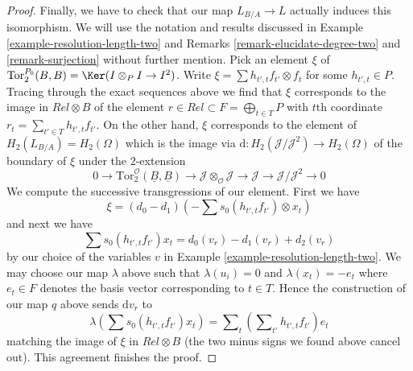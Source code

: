 \begin{proof}
\medskip\noindent
Finally, we have to check that our map $L_{B/A} \to L$ actually induces
this isomorphism. We will use the notation and results discussed in
Example \ref{example-resolution-length-two} and
Remarks \ref{remark-elucidate-degree-two} and \ref{remark-surjection}
without further mention. Pick an element $\xi$ of
$\text{Tor}_2^{P_0}(B, B) = \Ker(I \otimes_P I \to I^2)$.
Write $\xi = \sum h_{t', t}f_{t'} \otimes f_t$ for some
$h_{t', t} \in P$. Tracing through the exact sequences above we
find that $\xi$ corresponds to the image in $Rel \otimes B$
of the element $r \in Rel \subset F = \bigoplus_{t \in T} P$ with
$t$th coordinate $r_t = \sum_{t' \in T} h_{t', t}f_{t'}$.
On the other hand, $\xi$ corresponds to the element of
$H_2(L_{B/A}) = H_2(\Omega)$ which is the image
via $\text{d} : H_2(\mathcal{J}/\mathcal{J}^2) \to H_2(\Omega)$
of the boundary of $\xi$ under the $2$-extension
$$
0 \to
\text{Tor}_2^\mathcal{O}(\underline{B}, \underline{B})
\to 
\mathcal{J} \otimes_\mathcal{O} \mathcal{J} \to \mathcal{J}
\to
\mathcal{J}/\mathcal{J}^2 \to 0
$$
We compute the successive transgressions of our element. First we have
$$
\xi = (d_0 - d_1)(- \sum s_0(h_{t', t} f_{t'}) \otimes x_t)
$$
and next we have
$$
\sum s_0(h_{t', t} f_{t'}) x_t = d_0(v_r) - d_1(v_r) + d_2(v_r)
$$
by our choice of the variables $v$ in
Example \ref{example-resolution-length-two}.
We may choose our map $\lambda$ above such that
$\lambda(u_i) = 0$ and $\lambda(x_t) = - e_t$ where $e_t \in F$
denotes the basis vector corresponding to $t \in T$.
Hence the construction of our map $q$ above sends $\text{d}v_r$ to
$$
\lambda(\sum s_0(h_{t', t} f_{t'}) x_t) =
\sum\nolimits_t \left(\sum\nolimits_{t'} h_{t', t}f_{t'}\right) e_t
$$
matching the image of $\xi$ in $Rel \otimes B$ (the two minus signs
we found above cancel out). This agreement finishes the proof.
\end{proof}

